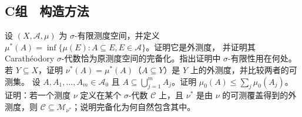 \subsection*{C组　构造方法}
\begin{enumerate}[label=\textbf{\thechapter.\arabic*.},resume]
 设 $(X,\mathcal A,\mu)$ 为 $\sigma$-有限测度空间，并定义
 $\mu^*(A)=\inf\{\mu(E):A\subseteq E, E\in\mathcal A\}$。证明它是外测度，
 并证明其 Carathéodory $\sigma$-代数恰为原测度空间的完备化。指出证明中
 $\sigma$-有限性用在何处。
 若 $Y\subseteq X$，证明 $\nu^*(A)=\mu^*(A)$（$A\subseteq Y$）是 $Y$
 上的外测度，并比较两者的可测集。
 设 $A,A_1,\ldots,A_m\in\mathcal A_0$ 且
 $A\subseteq\bigcup_{j=1}^mA_j$。证明
 $\mu_0(A)\le\sum_j\mu_0(A_j)$。
 证明：若一个测度 $\nu$ 定义在某个 $\sigma$-代数 $\mathcal C$ 上，且
 $\nu^*$ 是由 $\nu$ 的可测覆盖得到的外测度，则
 $\mathcal C\subseteq\mathcal M_{\nu^*}$；说明完备化为何自然包含其中。
\end{enumerate}
